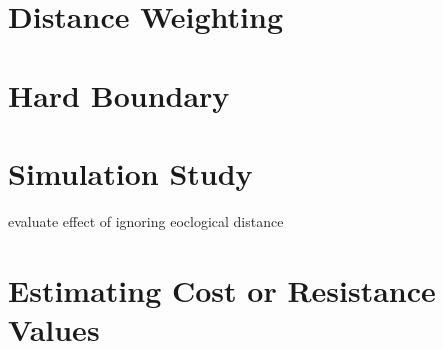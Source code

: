 \section{Distance Weighting}


\section{Hard Boundary}



\section{Simulation Study}

evaluate effect of ignoring eoclogical distance


\section{Estimating Cost or Resistance Values}




